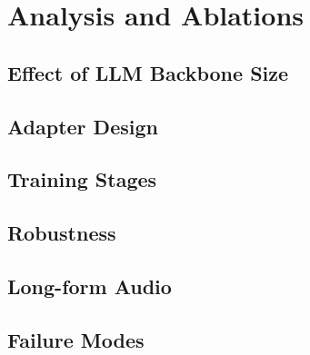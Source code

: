 \section{Analysis and Ablations}
\label{sec:analysis}

\subsection{Effect of LLM Backbone Size}

\subsection{Adapter Design}

\subsection{Training Stages}

\subsection{Robustness}

\subsection{Long-form Audio}

\subsection{Failure Modes}

